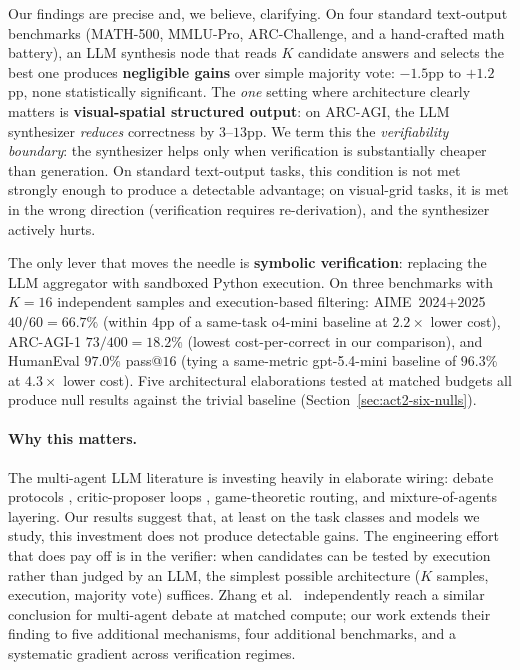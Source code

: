 \documentclass[11pt]{amsart}
\newcommand\1{{\mathds{1}}}
\theoremstyle{definition}
\theoremstyle{remark}
\numberwithin{equation}{section}
\begin{document}
Our findings are precise and, we believe, clarifying.
On four standard text-output benchmarks (MATH-500, MMLU-Pro, ARC-Challenge, and a hand-crafted math battery), an LLM synthesis node that reads $K$ candidate answers and selects the best one produces \textbf{negligible gains} over simple majority vote: $-1.5$pp to $+1.2$pp, none statistically significant.
The \emph{one} setting where architecture clearly matters is \textbf{visual-spatial structured output}: on ARC-AGI, the LLM synthesizer \emph{reduces} correctness by $3$--$13$pp.
We term this the \emph{verifiability boundary}: the synthesizer helps only when verification is substantially cheaper than generation.
On standard text-output tasks, this condition is not met strongly enough to produce a detectable advantage; on visual-grid tasks, it is met in the wrong direction (verification requires re-derivation), and the synthesizer actively hurts.

The only lever that moves the needle is \textbf{symbolic verification}: replacing the LLM aggregator with sandboxed Python execution.
On three benchmarks with $K\!=\!16$ independent samples and execution-based filtering: AIME~2024+2025 $40/60 = 66.7\%$ (within $4$pp of a same-task o4-mini baseline at $2.2\times$ lower cost), ARC-AGI-1 $73/400 = 18.2\%$ (lowest cost-per-correct in our comparison), and HumanEval $97.0\%$ pass@$16$ (tying a same-metric gpt-5.4-mini baseline of $96.3\%$ at $4.3\times$ lower cost).
Five architectural elaborations tested at matched budgets all produce null results against the trivial baseline (Section~\ref{sec:act2-six-nulls}).

\paragraph{Why this matters.}
The multi-agent LLM literature is investing heavily in elaborate wiring: debate protocols \cite{Du2023Debate}, critic-proposer loops \cite{Shinn2023Reflexion, Madaan2023SelfRefine}, game-theoretic routing, and mixture-of-agents layering.
Our results suggest that, at least on the task classes and models we study, this investment does not produce detectable gains.
The engineering effort that does pay off is in the verifier: when candidates can be tested by execution rather than judged by an LLM, the simplest possible architecture ($K$ samples, execution, majority vote) suffices.
Zhang et al.\ \cite{Zhang2025StopOvervaluingMAD} independently reach a similar conclusion for multi-agent debate at matched compute; our work extends their finding to five additional mechanisms, four additional benchmarks, and a systematic gradient across verification regimes.
\end{document}
